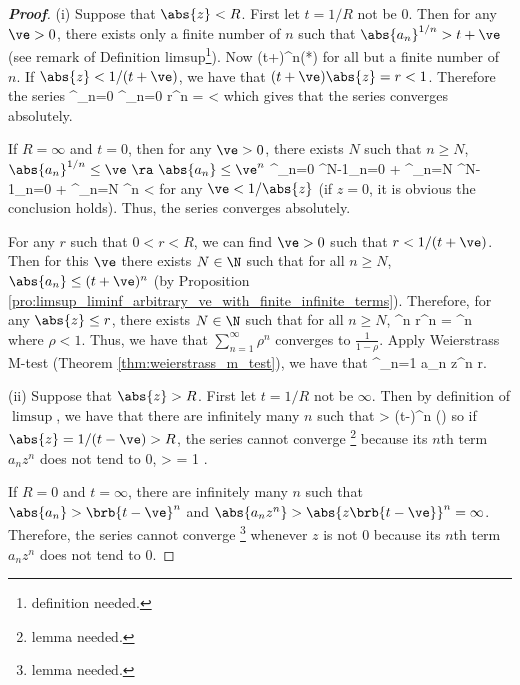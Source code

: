 \begin{proof}[\bf Proof]%
\ben
\item [(i)] Suppose that $\abs{z}< R$. First let $t = 1/R$ not be 0. Then for any $\ve>0$, there exists only a finite number of $n$ such that $\abs{a_n}^{1/n}  > t +\ve$ (see remark of Definition limsup\footnote{definition needed.}). Now
\be
{} \leq (t+\ve)^n\qquad (*)
\ee
for all but a finite number of $n$. If $\abs{z} < 1/(t+\ve)$, we have that $(t+\ve)\abs{z} = r<1$. Therefore the series
\be
\sum^\infty_{n=0}  \leq \sum^\infty_{n=0} r^n =  < \infty
\ee
which gives that the series converges absolutely.

If $R = \infty$ and $t = 0$, then for any $\ve > 0$, there exists $N$ such that $n\geq N$, $\abs{a_n}^{1/n} \leq \ve \ \ra\ \abs{a_n} \leq \ve^n$
\be
\sum^\infty_{n=0}  \leq \sum^{N-1}_{n=0}  + \sum^\infty_{n=N}  \leq \sum^{N-1}_{n=0}  + \sum^\infty_{n=N} ^n <\infty
\ee
for any $\ve <1/\abs{z}$ (if $z = 0$, it is obvious the conclusion holds). Thus, the series converges absolutely.


For any $r$ such that $0<r<R$, we can find $\ve>0$ such that $r < 1/(t+\ve)$. Then for this $\ve$ there exists $N\in\N$ such that for all $n\geq N$, $\abs{a_n} \leq (t+\ve)^n$ (by Proposition \ref{pro:limsup_liminf_arbitrary_ve_with_finite_infinite_terms}). Therefore, for any $\abs{z} \leq r$, there exists $N\in \N$ such that for all $n\geq N$,
\be
{} \leq {}^n r^n = \rho^n
\ee
where $\rho < 1$. Thus, we have that $\sum^\infty_{n=1} \rho^n$ converges to $\frac 1{1-\rho}$. Apply Weierstrass M-test (Theorem \ref{thm:weierstrass_m_test}), we have that
\be
\sum^\infty_{n=1} a_n z^n  \leq r.
\ee


\item [(ii)] Suppose that $\abs{z}> R$. First let $t = 1/R$ not be $\infty$. Then by definition of $\limsup$, we have that there are infinitely many $n$ such that
\be
{} > (t-\ve)^n \qquad (\dag)
\ee
so if $\abs{z} = 1/(t-\ve)> R$, the series cannot converge \footnote{lemma needed.} because its $n$th term $a_nz^n$ does not tend to 0,
\be
{} >  = 1 .
\ee

If $R = 0$ and $t =\infty$, there are infinitely many $n$ such that $\abs{a_n} > \brb{t-\ve}^n $ and $\abs{a_n z^n} > \abs{z\brb{t-\ve}}^n =\infty$. Therefore, the series cannot converge \footnote{lemma needed.} whenever $z$ is not 0 because its $n$th term $a_nz^n$ does not tend to 0.
\een
\end{proof}


